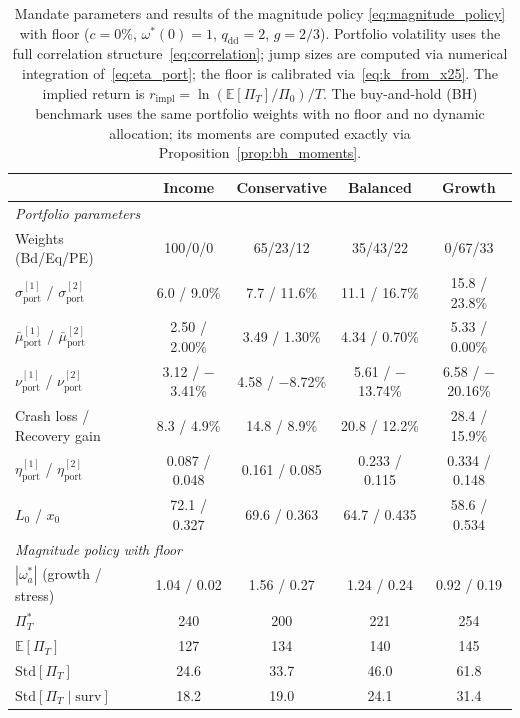 \documentclass[11pt,a4paper]{article}
\numberwithin{equation}{section}
\newcommand{\E}{\mathbb{E}}
\begin{document}
\begin{table}[H]
\centering
\caption{Mandate parameters and results of the magnitude policy \eqref{eq:magnitude_policy} with floor ($c = 0\%$, 
$\omega^*(0) = 1$, $q_{\mathrm{dd}} = 2$, $g = 2/3$). 
Portfolio volatility uses the full correlation 
structure~\eqref{eq:correlation}; jump sizes are computed via numerical 
integration of~\eqref{eq:eta_port}; the floor is calibrated 
via~\eqref{eq:k_from_x25}. The implied return is 
$r_{\mathrm{impl}} = \ln(\E[\Pi_T]/\Pi_0)/T$.
The buy-and-hold (BH) benchmark uses the same portfolio weights 
with no floor and no dynamic allocation; its moments are computed exactly via Proposition~\ref{prop:bh_moments}.}
\label{tab:mandates}
\small
\begin{tabular}{lcccc}
\toprule
& \textbf{Income} & \textbf{Conservative} & \textbf{Balanced} 
& \textbf{Growth} \\
\midrule
\multicolumn{5}{l}{\textit{Portfolio parameters}} \\
Weights (Bd/Eq/PE) & 100/0/0 & 65/23/12 & 35/43/22 & 0/67/33 \\
$\sigma^{[1]}_{\mathrm{port}}$ / $\sigma^{[2]}_{\mathrm{port}}$ 
  & 6.0 / 9.0\% & 7.7 / 11.6\% & 11.1 / 16.7\% & 15.8 / 23.8\% \\
$\bar{\mu}^{[1]}_{\mathrm{port}}$ / $\bar{\mu}^{[2]}_{\mathrm{port}}$ 
  & 2.50 / 2.00\% & 3.49 / 1.30\% & 4.34 / 0.70\% & 5.33 / 0.00\% \\
$\nu^{[1]}_{\mathrm{port}}$ / $\nu^{[2]}_{\mathrm{port}}$ 
  & 3.12 / $-$3.41\% & 4.58 / $-$8.72\% & 5.61 / $-$13.74\% & 6.58 / $-$20.16\% \\
Crash loss / Recovery gain 
  & 8.3 / 4.9\% & 14.8 / 8.9\% & 20.8 / 12.2\% & 28.4 / 15.9\% \\
$\eta^{[1]}_{\mathrm{port}}$ / $\eta^{[2]}_{\mathrm{port}}$ 
  & 0.087 / 0.048 & 0.161 / 0.085 & 0.233 / 0.115 & 0.334 / 0.148 \\
$L_{0}$ / $x_0$ 
  & 72.1 / 0.327 & 69.6 / 0.363 & 64.7 / 0.435 & 58.6 / 0.534 \\
\midrule
\multicolumn{5}{l}{\textit{Magnitude policy with floor}} \\
$|\omega^*_a|$ (growth / stress) 
  & 1.04 / 0.02 & 1.56 / 0.27 & 1.24 / 0.24 & 0.92 / 0.19 \\
$\Pi^*_T$ & 240 & 200 & 221 & 254 \\
$\E[\Pi_T]$ & 127 & 134 & 140 & 145 \\
$\mathrm{Std}[\Pi_T]$ & 24.6 & 33.7 & 46.0 & 61.8 \\
$\mathrm{Std}[\Pi_T \mid \mathrm{surv}]$ & 18.2 & 19.0 & 24.1 & 31.4 \\

\end{tabular}
\end{table}
\end{document}
